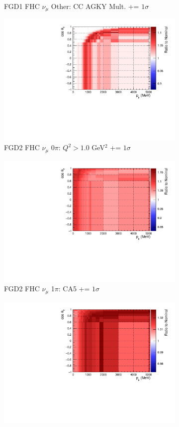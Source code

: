 \begin{figure}
\begin{subfigure}{.32\textwidth}
  \caption{FGD1 FHC $\nu_{\mu}$ Other: CC AGKY Mult. += $1\sigma$}
  \label{fig:sigvar_FGD1_numuCC_other}
\end{subfigure}
\centering
\begin{subfigure}{.32\textwidth}
  \centering
  \includegraphics[width=0.85\linewidth]{figs/sig/FGD2_numuCC_0pi_Q2_norm_7_+1sig.pdf}
  \caption{FGD2 FHC $\nu_{\mu}$ 0$\pi$: $Q^2 > 1.0$ GeV$^2$ += $1\sigma$}
  \label{fig:sigvar_FGD2_numuCC_0pi}
\end{subfigure}
\begin{subfigure}{.32\textwidth}
  \centering
  \includegraphics[width=0.85\linewidth]{figs/sig/FGD2_numuCC_1pi_CA5_+1sig.pdf}
  \caption{FGD2 FHC $\nu_{\mu}$ 1$\pi$: CA5 += $1\sigma$}
  \label{fig:sigvar_FGD2_numuCC_1pi}
\end{subfigure}
\begin{subfigure}{.32\textwidth}
  \centering
  \includegraphics[width=0.85\linewidth]{figs/sig/FGD2_numuCC_other_CC_DIS_MultPi_Norm_Nu_+1sig.pdf}

\end{subfigure}
\end{figure}
